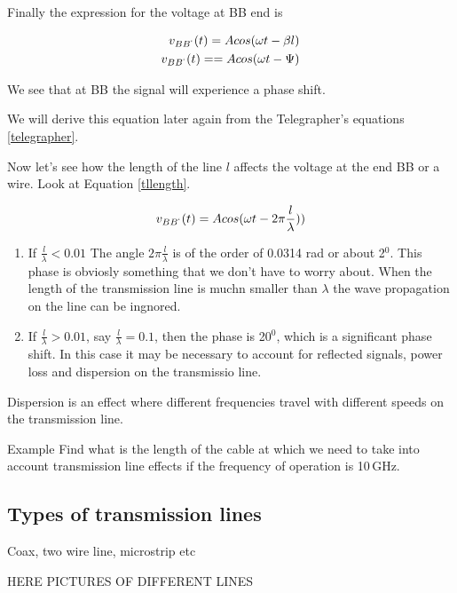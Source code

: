 Finally the expression for the voltage at BB end is


\begin{eqnarray}
v_{BB^`}(t)=A cos(\omega t - \beta l) \\
v_{BB^`}(t)==A cos(\omega t - \Psi)
\end{eqnarray}

We see that at BB the signal will experience a phase shift.

We will derive this equation later again from the Telegrapher's
equations \ref{telegrapher}. 

Now let's see how the length of the line $l$ affects the voltage at the
end BB or a wire. Look at Equation \ref{tllength}.


\begin{eqnarray}
v_{BB^`}(t)=A cos(\omega t - 2 \pi \frac{ l }{\lambda} )) \label{tllength}
\end{eqnarray}



\begin{enumerate}
\item If $\frac{l}{\lambda} < 0.01$ The angle $2 \pi
\frac{l}{\lambda}$ is of the order of 0.0314 rad or about 2$^0$. This
phase is obviosly something that we don't have to worry about. When
the length of the transmission line is muchn smaller than $\lambda$
the wave propagation on the line can be ingnored.
\item If  $\frac{l}{\lambda} > 0.01$, say  $\frac{l}{\lambda} =0.1$,
then the phase is 20$^0$, which is a significant phase shift. In this
case it may be necessary to account for reflected signals, power loss
and dispersion on the transmissio line.
\end{enumerate}

Dispersion is an effect where different frequencies travel with
different speeds on the transmission line.

{\large Example}
Find what is the length of the cable at which we need to take into account
transmission line effects if the frequency of operation is 10\,GHz.





\subsection{Types of transmission lines}

Coax, two wire line, microstrip etc

HERE PICTURES OF DIFFERENT LINES



